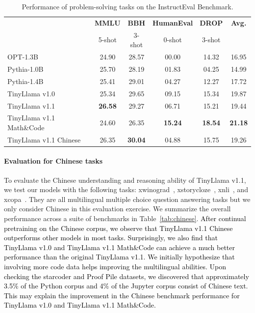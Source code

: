 \documentclass{article}
\begin{document}
\vspace{-1em}
\begin{table}[htbp!]
  \centering
  \scriptsize
  \caption{ Performance of problem-solving tasks on the InstructEval Benchmark.
  }
  \begin{tabular}{lccccc}
    \toprule
     & \textbf{MMLU}	&\textbf{BBH}&	\textbf{HumanEval}&	\textbf{DROP} & \textbf{Avg.} \\
     & 5-shot& 3-shot& 0-shot& 3-shot& \\
           
    
    \midrule    
    OPT-1.3B\xspace      & 24.90 &	28.57 &	{\color{white} 0}0.00 &	14.32 & 16.95\\
    Pythia-1.0B\xspace      & 25.70 &	28.19 &	{\color{white} 0}1.83 &	{\color{white} 0}4.25 & 14.99\\
    Pythia-1.4B\xspace      & 25.41 &	29.01 &	{\color{white} 0}4.27  &	12.27 & 17.72 \\
    \midrule
        TinyLlama v1.0\xspace      & 25.34 &29.65 &	{\color{white} 0}9.15	& 15.34 & {19.87} \\

        TinyLlama v1.1\xspace      & \textbf{26.58} & 29.27 & {\color{white} 0}6.71 & 15.21 & 19.44 \\
        TinyLlama v1.1 Math\&Code \xspace      & 24.60 & 26.35 & \textbf{15.24} & \textbf{18.54} & \textbf{21.18} \\
        TinyLlama v1.1 Chinese \xspace      & 26.35 & \textbf{30.04} & {\color{white} 0}4.88 & 15.75 & 19.26 \\
    \bottomrule
  \end{tabular}
  \label{tab:pretrained_Instrust}
\end{table}

\vspace{-1em}

\paragraph{Evaluation for Chinese tasks}
To evaluate the Chinese understanding and reasoning ability of TinyLlama v1.1, we test our models with the following {\color{black}tasks}: xwinograd~\citep{emelin-sennrich-2021-wino}, xstorycloze~\citep{lin-etal-2022-shot}, xnli~\citep{conneau-etal-2018-xnli}, {\color{black}and} xcopa~\citep{ponti-etal-2020-xcopa}.
They are all multilingual multiple choice question answering tasks but we only consider Chinese in this {\color{black}evaluation exercise}.
We summarize the overall performance across a suite of benchmarks in Table~\ref{tab:chinese}.
\textcolor{black}{After continual pretraining on the Chinese corpus, we observe that TinyLlama v1.1 Chinese outperforms other models in most tasks.
Surprisingly, we also find that TinyLlama v1.0 and TinyLlama v1.1 Math\&Code can achieve a much better performance than the original TinyLlama v1.1.
We initially hypothesize that involving more code data helps improving the multilingual abilities.
Upon checking the starcoder and Proof Pile datasets, we discovered that approximately 3.5\% of the Python corpus and 4\% of the Jupyter corpus consist of Chinese text.
This may explain the improvement in the Chinese benchmark performance for TinyLlama v1.0 and TinyLlama v1.1 Math\&Code.
}
\end{document}
